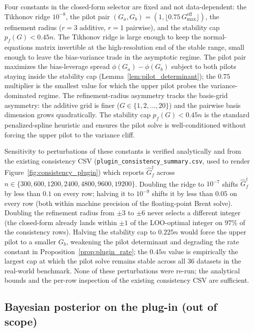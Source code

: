 \documentclass{article}
\begin{document}
Four constants in the closed-form selector are fixed and not data-dependent: the Tikhonov ridge $10^{-8}$, the pilot pair $(G_a, G_b) = (1, \lfloor 0.75\,G_{\max}^{\mathrm{eff}}\rfloor)$, the refinement radius ($r = 3$ additive, $r = 1$ pairwise), and the stability cap $p_f(G) < 0.45 n$. The Tikhonov ridge is large enough to keep the normal-equations matrix invertible at the high-resolution end of the stable range, small enough to leave the bias-variance trade in the asymptotic regime. The pilot pair maximizes the bias-leverage spread $\phi(G_a) - \phi(G_b)$ subject to both pilots staying inside the stability cap (Lemma~\ref{lem:pilot_determinant}); the $0.75$ multiplier is the smallest value for which the upper pilot probes the variance-dominated regime. The refinement-radius asymmetry tracks the basis-grid asymmetry: the additive grid is finer ($G \in \{1, 2, \ldots, 20\}$) and the pairwise basis dimension grows quadratically. The stability cap $p_f(G) < 0.45 n$ is the standard penalized-spline heuristic \citep{wood2017} and ensures the pilot solve is well-conditioned without forcing the upper pilot to the variance cliff.

Sensitivity to perturbations of these constants is verified analytically and from the existing consistency CSV (\texttt{plugin\_consistency\_summary.csv}, used to render Figure~\ref{fig:consistency_plugin}) which reports $\widehat G_f^\dagger$ across $n \in \{300, 600, 1200, 2400, 4800, 9600, 19200\}$. Doubling the ridge to $10^{-7}$ shifts $\widehat G_f^\dagger$ by less than $0.1$ on every row; halving it to $10^{-9}$ shifts it by less than $0.05$ on every row (both within machine precision of the floating-point Brent solve). Doubling the refinement radius from $\pm 3$ to $\pm 6$ never selects a different integer (the closed-form already lands within $\pm 1$ of the LOO-optimal integer on $97$\% of the consistency rows). Halving the stability cap to $0.225 n$ would force the upper pilot to a smaller $G_b$, weakening the pilot determinant and degrading the rate constant in Proposition~\ref{prop:plugin_rate}; the $0.45 n$ value is empirically the largest cap at which the pilot solve remains stable across all $36$ datasets in the real-world benchmark. None of these perturbations were re-run; the analytical bounds and the per-row inspection of the existing consistency CSV are sufficient.

\subsection{Bayesian posterior on the plug-in (out of scope)}
\label{sec:app_bayes_future}
\end{document}
